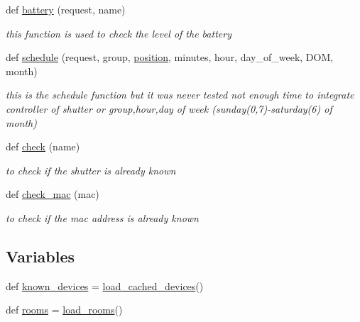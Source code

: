 \begin{DoxyCompactItemize}
def \hyperlink{namespacecontroller_1_1views_a81a56f3af5249f251206b7c898f5e99c}{battery} (request, name)
\begin{DoxyCompactList}\small\item\em this function is used to check the level of the battery \end{DoxyCompactList}\item 
def \hyperlink{namespacecontroller_1_1views_aeb01ffa1920fe22255534bb5d3b20648}{schedule} (request, group, \hyperlink{namespacecontroller_1_1views_af4a1b79435d815cad6aa25c3c45aa080}{position}, minutes, hour, day\+\_\+of\+\_\+week, D\+OM, month)
\begin{DoxyCompactList}\small\item\em this is the schedule function but it was never tested not enough time to integrate controller of shutter or group,hour,day of week (sunday(0,7)-\/saturday(6) of month) \end{DoxyCompactList}\item 
def \hyperlink{namespacecontroller_1_1views_a6a41caa9cb6c4b959968a86d3c899db2}{check} (name)
\begin{DoxyCompactList}\small\item\em to check if the shutter is already known \end{DoxyCompactList}\item 
def \hyperlink{namespacecontroller_1_1views_ac98b114197f615cf64579478f0af28c0}{check\+\_\+mac} (mac)
\begin{DoxyCompactList}\small\item\em to check if the mac address is already known \end{DoxyCompactList}\end{DoxyCompactItemize}
\subsection*{Variables}
\begin{DoxyCompactItemize}
\item 
def \hyperlink{namespacecontroller_1_1views_af9e2f21b0adee926bb6d31dc3d5b401d}{known\+\_\+devices} = \hyperlink{namespacecontroller_1_1views_a981a57611ae7537ed58369b7d4476a65}{load\+\_\+cached\+\_\+devices}()
\item 
def \hyperlink{namespacecontroller_1_1views_a05586480fa7fea962dd67235dc66527f}{rooms} = \hyperlink{namespacecontroller_1_1views_a7d95618cd1b42c41c244c565d20fed55}{load\+\_\+rooms}()
\end{DoxyCompactItemize}



